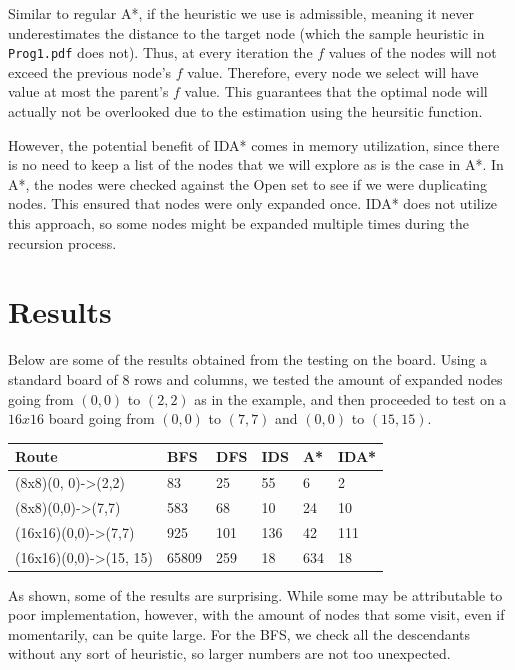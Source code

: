 \documentclass{article}
\begin{document}
	Similar to regular A*, if the heuristic we use is admissible, meaning it never underestimates
	the distance to the target node (which the sample heuristic in \texttt{Prog1.pdf} does not). 
	Thus, at every iteration the $f$ values of the nodes will not exceed the previous node's 
	$f$ value. Therefore, every node we select will have value at most the parent's $f$ value. 
	This guarantees that the optimal node will actually not be overlooked due to the estimation
	using the heursitic function. 

	However, the potential benefit of IDA* comes in memory utilization, since there is no need
	to keep a list of the nodes that we will explore as is the case in A*. In A*, the nodes were 
	checked against the Open set to see if we were duplicating nodes. This ensured that nodes were
	only expanded once. IDA* does not utilize this approach, so some nodes might be expanded 
	multiple times during the recursion process.


\section{Results}
	Below are some of the results obtained from the testing on the board. Using a standard board 
	of 8 rows  and columns, we tested the amount of expanded nodes going from $(0, 0)$ to $(2, 2)$
	as in the example, and then proceeded to test on a $16x16$ board going from $(0, 0)$ to $(7, 7)$
	and $(0, 0)$ to $(15, 15)$.

	\begin{center}
		\begin{tabular}[c]{|l | l | l | l | l | l |}
				\hline
				Route & BFS & DFS & IDS & A* & IDA* \\ \hline
				(8x8)(0, 0)->(2,2) & 83 & 25 & 55 & 6 & 2\\ \hline
				(8x8)(0,0)->(7,7) & 583 & 68 & 10 & 24 & 10\\ \hline
				(16x16)(0,0)->(7,7) & 925 & 101 & 136 & 42 & 111\\ \hline
				(16x16)(0,0)->(15, 15) & 65809 & 259 & 18 & 634 & 18\\ 
				
				\hline
		\end{tabular}
	\end{center}

	As shown, some of the results are surprising. While some may be attributable to poor implementation,
	however, with the amount of nodes that some visit, even if momentarily, can be quite large. For the BFS,
	we check all the descendants without any sort of heuristic, so larger numbers are not 
	too unexpected. 
\end{document}
